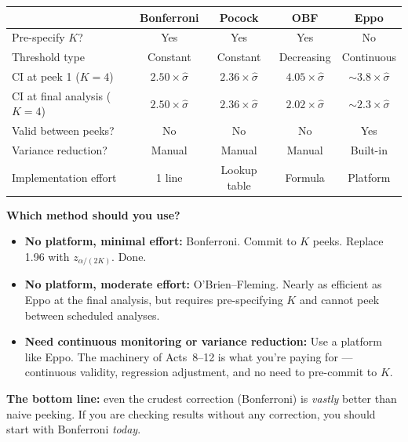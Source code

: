\documentclass[12pt, a4paper]{article}
\begin{document}
\begin{center}
\renewcommand{\arraystretch}{1.3}
\begin{tabular}{@{} l c c c c @{}}
\toprule
& \textbf{Bonferroni} & \textbf{Pocock} & \textbf{OBF} & \textbf{Eppo} \\
\midrule
Pre-specify $K$?
  & Yes & Yes & Yes & No \\
Threshold type
  & Constant & Constant & Decreasing & Continuous \\
CI at peek 1 ($K{=}4$)
  & $2.50\times\hat{\sigma}$ & $2.36\times\hat{\sigma}$
  & $4.05\times\hat{\sigma}$ & $\sim\!3.8\times\hat{\sigma}$ \\
CI at final analysis ($K{=}4$)
  & $2.50\times\hat{\sigma}$ & $2.36\times\hat{\sigma}$
  & $2.02\times\hat{\sigma}$ & $\sim\!2.3\times\hat{\sigma}$ \\
Valid between peeks?
  & No & No & No & Yes \\
Variance reduction?
  & Manual & Manual & Manual & Built-in \\
Implementation effort
  & 1 line & Lookup table & Formula & Platform \\
\bottomrule
\end{tabular}
\end{center}

\begin{keytakeaway}
\textbf{Which method should you use?}
\begin{itemize}[nosep]
  \item \textbf{No platform, minimal effort:} Bonferroni.  Commit to $K$
        peeks.  Replace 1.96 with $z_{\alpha/(2K)}$.  Done.
  \item \textbf{No platform, moderate effort:} O'Brien--Fleming.  Nearly as
        efficient as Eppo at the final analysis, but requires pre-specifying
        $K$ and cannot peek between scheduled analyses.
  \item \textbf{Need continuous monitoring or variance reduction:} Use a
        platform like Eppo.  The machinery of Acts~8--12 is what you're
        paying for --- continuous validity, regression adjustment, and
        no need to pre-commit to $K$.
\end{itemize}

\textbf{The bottom line:} even the crudest correction (Bonferroni) is
\emph{vastly} better than naive peeking.  If you are checking results
without any correction, you should start with Bonferroni \emph{today}.
\end{keytakeaway}
\end{document}
